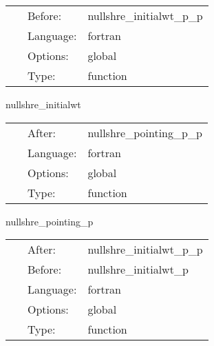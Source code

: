 \hspace{5mm}

 \begin{tabular*}{160mm}{cll} 
~ & Before:  & nullshre\_initialwt\_p\_p \\ 
~ & Language:  & fortran \\ 
~ & Options:  & global \\ 
~ & Type:  & function \\ 
\end{tabular*} 


\vspace{5mm}


\hspace{5mm} nullshre\_initialwt 

\hspace{5mm}{\it extracted variables on the world tube for the p\_p\_init level only up to rl } 


\hspace{5mm}

 \begin{tabular*}{160mm}{cll} 
~ & After:  & nullshre\_pointing\_p\_p \\ 
~ & Language:  & fortran \\ 
~ & Options:  & global \\ 
~ & Type:  & function \\ 
\end{tabular*} 


\vspace{5mm}


\hspace{5mm} nullshre\_pointing\_p 

\hspace{5mm}{\it target p-level variables for the pointers used in initialization } 


\hspace{5mm}

 \begin{tabular*}{160mm}{cll} 
~ & After:  & nullshre\_initialwt\_p\_p \\ 
~ & Before:  & nullshre\_initialwt\_p \\ 
~ & Language:  & fortran \\ 
~ & Options:  & global \\ 
~ & Type:  & function \\ 
\end{tabular*} 


